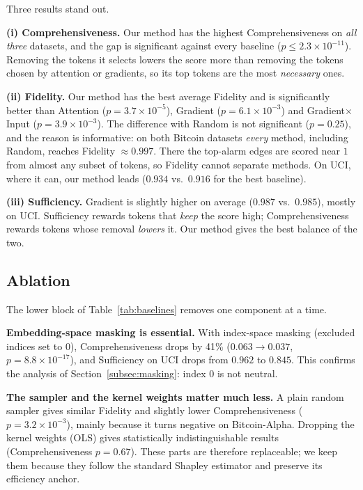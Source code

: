 \documentclass[conference]{IEEEtran}
\begin{document}
Three results stand out.

\noindent\textbf{(i) Comprehensiveness.} Our method has the highest
Comprehensiveness on \emph{all three} datasets, and the gap is significant
against every baseline ($p\le2.3\times10^{-11}$). Removing the tokens it selects
lowers the score more than removing the tokens chosen by attention or
gradients, so its top tokens are the most \emph{necessary} ones.

\noindent\textbf{(ii) Fidelity.} Our method has the best average Fidelity and is
significantly better than Attention ($p=3.7\times10^{-5}$), Gradient
($p=6.1\times10^{-3}$) and Gradient$\times$Input ($p=3.9\times10^{-3}$). The
difference with Random is not significant ($p=0.25$), and the reason is
informative: on both Bitcoin datasets \emph{every} method, including Random,
reaches Fidelity $\approx0.997$. There the top-alarm edges are scored near $1$
from almost any subset of tokens, so Fidelity cannot separate methods. On UCI,
where it can, our method leads ($0.934$ vs.\ $0.916$ for the best baseline).

\noindent\textbf{(iii) Sufficiency.} Gradient is slightly higher on average
($0.987$ vs.\ $0.985$), mostly on UCI. Sufficiency rewards tokens that
\emph{keep} the score high; Comprehensiveness rewards tokens whose removal
\emph{lowers} it. Our method gives the best balance of the two.

\subsection{Ablation}
\label{subsec:ablation}
The lower block of Table~\ref{tab:baselines} removes one component at a time.

\noindent\textbf{Embedding-space masking is essential.} With index-space masking
(excluded indices set to $0$), Comprehensiveness drops by 41\% ($0.063\to0.037$,
$p=8.8\times10^{-17}$), and Sufficiency on UCI drops from $0.962$ to $0.845$.
This confirms the analysis of Section~\ref{subsec:masking}: index $0$ is not
neutral.

\noindent\textbf{The sampler and the kernel weights matter much less.} A plain
random sampler gives similar Fidelity and slightly lower Comprehensiveness
($p=3.2\times10^{-3}$), mainly because it turns negative on Bitcoin-Alpha.
Dropping the kernel weights (OLS) gives statistically indistinguishable results
(Comprehensiveness $p=0.67$). These parts are therefore replaceable; we keep
them because they follow the standard Shapley estimator
\cite{lundberg2017shap,duval2021graphsvx} and preserve its efficiency anchor.
\end{document}
